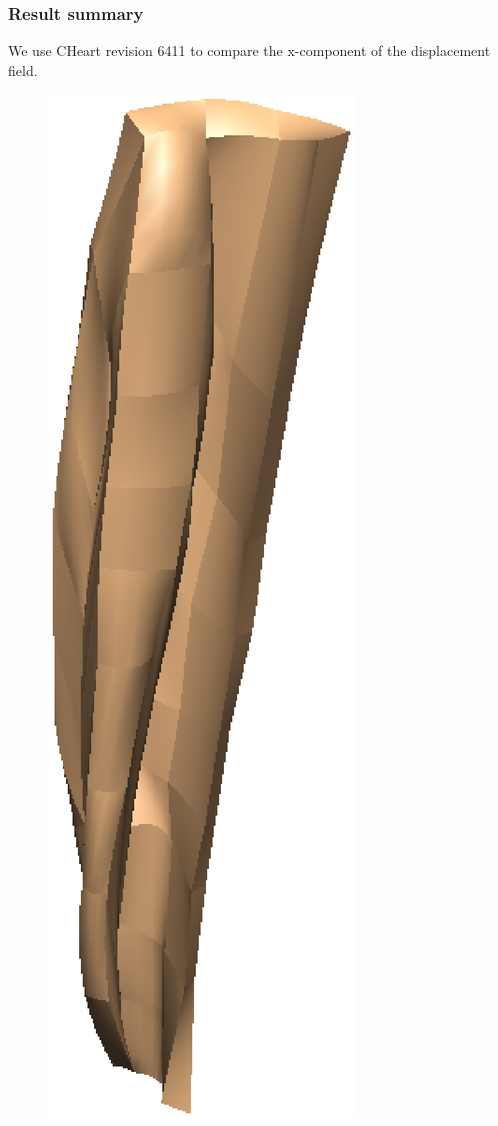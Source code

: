 \subsubsection{Result summary}
%
We use CHeart revision 6411 to compare the x-component of the displacement
field.
%


%
\begin{figure}[h!]
    \centering
    \includegraphics[width=0.49\columnwidth]{examples/example-0204-u/doc/figures/undeformed_geometry.eps}

\end{figure}
